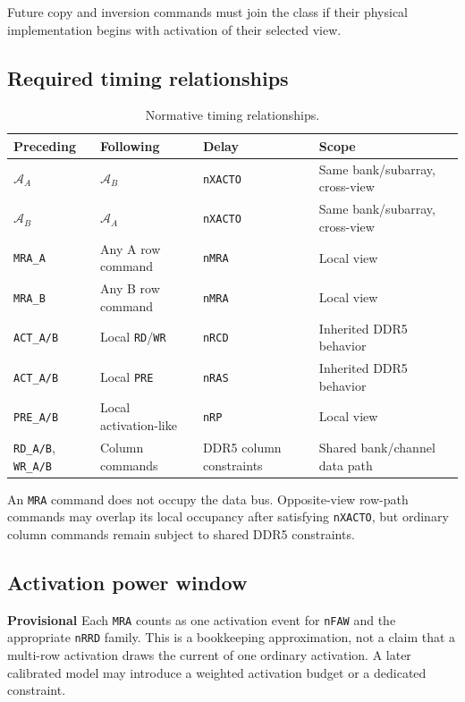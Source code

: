 \documentclass[9pt,twocolumn]{extarticle}
\newcommand{\cmd}[1]{\texttt{#1}}
\newcommand{\param}[1]{\texttt{#1}}
\newcommand{\viewA}{\textsf{A}}
\newcommand{\viewB}{\textsf{B}}
\newcommand{\provisional}{\textcolor{DDRAMOrange}{\textbf{Provisional}}}
\begin{document}
Future copy and inversion commands must join the class if their physical
implementation begins with activation of their selected view.

\subsection{Required timing relationships}

\begin{table}[t]
\centering
\caption{Normative timing relationships.}
\label{tab:constraints}
\begin{tabularx}{\textwidth}{@{}p{}p{}p{}X@{}}
\toprule
Preceding & Following & Delay & Scope \\
\midrule
\rowcolor{DDRAMGrey}$\mathcal{A}_{A}$ & $\mathcal{A}_{B}$ & \param{nXACTO} & Same bank/subarray, cross-view \\
$\mathcal{A}_{B}$ & $\mathcal{A}_{A}$ & \param{nXACTO} & Same bank/subarray, cross-view \\
\rowcolor{DDRAMGrey}\cmd{MRA\_A} & Any \viewA{} row command & \param{nMRA} & Local view \\
\cmd{MRA\_B} & Any \viewB{} row command & \param{nMRA} & Local view \\
\rowcolor{DDRAMGrey}\cmd{ACT\_A/B} & Local \cmd{RD}/\cmd{WR} & \param{nRCD} & Inherited DDR5 behavior \\
\cmd{ACT\_A/B} & Local \cmd{PRE} & \param{nRAS} & Inherited DDR5 behavior \\
\rowcolor{DDRAMGrey}\cmd{PRE\_A/B} & Local activation-like & \param{nRP} & Local view \\
\cmd{RD\_A/B}, \cmd{WR\_A/B} & Column commands & DDR5 column constraints & Shared bank/channel data path \\
\bottomrule
\end{tabularx}
\end{table}

An \cmd{MRA} command does not occupy the data bus. Opposite-view row-path
commands may overlap its local occupancy after satisfying \param{nXACTO}, but
ordinary column commands remain subject to shared DDR5 constraints.

\subsection{Activation power window}

\provisional{} Each \cmd{MRA} counts as one activation event for \param{nFAW}
and the appropriate \param{nRRD} family. This is a bookkeeping approximation,
not a claim that a multi-row activation draws the current of one ordinary
activation. A later calibrated model may introduce a weighted activation
budget or a dedicated constraint.
\end{document}
